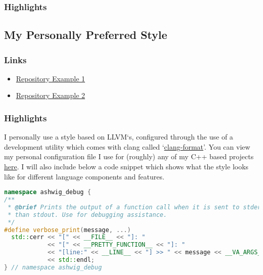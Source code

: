 \documentclass[12pt]{report}
\theoremstyle{definition}
\theoremstyle{plain}
\theoremstyle{plain}
\begin{document}
          \subsubsection{Highlights}
          
        \subsection{My Personally Preferred Style}
          \subsubsection{Links}
            \begin{itemize}
                \item \href{https://github.com/ashellwig/ashellwig_m4c8_programming_assignment}{Repository Example 1}
                \item \href{https://github.com/ashellwig/ashellwig_m5c9_programming_assignment}{Repository Example 2}
            \end{itemize}
          \subsubsection{Highlights}
            I personally use a style based on LLVM`s, configured through the use of a development
              utility which comes with clang called `\href{https://clang.llvm.org/docs/ClangFormat.html}{clang-format}'. You can view my
              personal configuration file I use for (roughly) any of my C++ based projects
              \href{https://github.com/ashellwig/ashellwig_m5c9_programming_assignment/blob/master/.clang-format}{here}. I will also include below a code snippet which shows what the style looks like for
              different language components and features.
              
            \begin{lstlisting}[language=c++,caption={Ashton`s clang-format Result -- Macros}]
namespace ashwig_debug {
/**
 * @brief Prints the output of a function call when it is sent to stderr rather
 * than stdout. Use for debugging assistance.
 */
#define verbose_print(message, ...)                                            \
  std::cerr << "[" << __FILE__ << "]: "                                        \
            << "[" << __PRETTY_FUNCTION__ << "]: "                             \
            << "[line:" << __LINE__ << "] >> " << message << __VA_ARGS__       \
            << std::endl;
} // namespace ashwig_debug
\end{lstlisting} 
\end{document}
